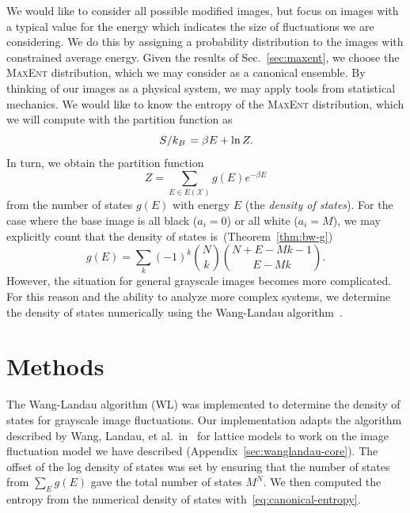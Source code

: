 \documentclass[aps,reprint]{revtex4-2}
\renewcommand\mathrm\textnormal%
\theoremstyle{plain}
\theoremstyle{definition}
\renewcommand\ln{\operatorname{\mathrm{ln}}}
\begin{document}
We would like to consider all possible modified images, but focus on images with
a typical value for the energy which indicates the size of fluctuations we are
considering. We do this by assigning a probability distribution to the images
with constrained average energy. Given the results of Sec.~\ref{sec:maxent}, we
choose the \textsc{MaxEnt} distribution, which we may consider as a canonical
ensemble. By thinking of our images as a physical system, we may apply tools
from statistical mechanics. We would like to know the entropy of the
\textsc{MaxEnt} distribution, which we will compute with the partition function as
\begin{equation}
  \flatfrac{S}{k_B}
  = \beta E + \ln Z.
  \label{eq:canonical-entropy}
\end{equation}
In turn, we obtain the partition function
\begin{equation}
  Z
  = \sum_{E \in E(\mathcal{X})} g(E) e^{-\beta E}
  \label{eq:partition-function}
\end{equation}
from the number of states $g(E)$ with energy $E$ (the \emph{density of states}).
For the case where the base image is all black ($a_i = 0$) or all white ($a_i =
M$), we may explicitly count that the density of states
is~(Theorem~\ref{thm:bw-g})
\begin{equation}
  g(E)
  = \sum_k {(-1)}^k \binom{N}{k} \binom{N + E - Mk - 1}{E - Mk}.
  \label{eq:bw-g}
\end{equation}
However, the situation for general grayscale images becomes more complicated.
For this reason and the ability to analyze more complex systems, we determine
the density of states numerically using the Wang-Landau
algorithm~\cite{wanglandau}.

\section{Methods}

The Wang-Landau algorithm (WL) was implemented to determine the density of
states for grayscale image fluctuations. Our implementation adapts the algorithm
described by Wang, Landau, et al.\ in~\cite{wanglandau,wanglandau-ajp} for
lattice models to work on the image fluctuation model we have described
(Appendix~\ref{sec:wanglandau-core}). The offset of the log density of states
was set by ensuring that the number of states from $\sum_E g(E)$ gave the total
number of states $M^N$. We then computed the entropy from the numerical density
of states with~\eqref{eq:canonical-entropy}.
\end{document}
